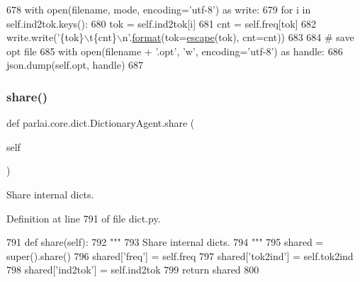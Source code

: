 \begin{DoxyCode}
678         with open(filename, mode, encoding=\textcolor{stringliteral}{'utf-8'}) \textcolor{keyword}{as} write:
679             \textcolor{keywordflow}{for} i \textcolor{keywordflow}{in} self.ind2tok.keys():
680                 tok = self.ind2tok[i]
681                 cnt = self.freq[tok]
682                 write.write(\textcolor{stringliteral}{'\{tok\}\(\backslash\)t\{cnt\}\(\backslash\)n'}.\hyperlink{namespaceparlai_1_1chat__service_1_1services_1_1messenger_1_1shared__utils_a32e2e2022b824fbaf80c747160b52a76}{format}(tok=\hyperlink{namespaceparlai_1_1core_1_1dict_ae44fe4a2be005a4023a758a58f656495}{escape}(tok), cnt=cnt))
683 
684         \textcolor{comment}{# save opt file}
685         with open(filename + \textcolor{stringliteral}{'.opt'}, \textcolor{stringliteral}{'w'}, encoding=\textcolor{stringliteral}{'utf-8'}) \textcolor{keyword}{as} handle:
686             json.dump(self.opt, handle)
687 
\end{DoxyCode}
\mbox{\label{classparlai_1_1core_1_1dict_1_1DictionaryAgent_a3d8996e367685451f7de85e8284243d7}} 
\subsubsection{\texorpdfstring{share()}{share()}}
{\footnotesize\ttfamily def parlai.\+core.\+dict.\+Dictionary\+Agent.\+share (\begin{DoxyParamCaption}\item[{}]{self }\end{DoxyParamCaption})}

\begin{DoxyVerb}Share internal dicts.
\end{DoxyVerb}
 

Definition at line 791 of file dict.\+py.


\begin{DoxyCode}
791     \textcolor{keyword}{def }share(self):
792         \textcolor{stringliteral}{"""}
793 \textcolor{stringliteral}{        Share internal dicts.}
794 \textcolor{stringliteral}{        """}
795         shared = super().share()
796         shared[\textcolor{stringliteral}{'freq'}] = self.freq
797         shared[\textcolor{stringliteral}{'tok2ind'}] = self.tok2ind
798         shared[\textcolor{stringliteral}{'ind2tok'}] = self.ind2tok
799         \textcolor{keywordflow}{return} shared
800 
\end{DoxyCode}
\mbox{\label{classparlai_1_1core_1_1dict_1_1DictionaryAgent_aea9aca40dd1bb1976f4042565b172d88}} 
